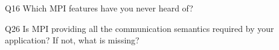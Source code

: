 \begin{description}%
\item{Q16} Which MPI features have you never heard of?%
\item{Q26} Is MPI providing all the communication semantics required by your application? If not, what is missing?%
\end{description}%
